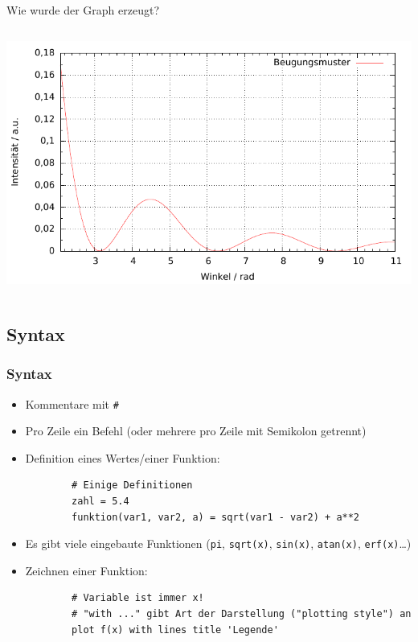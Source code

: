 \begin{frame}[<+->]
	Wie wurde der Graph erzeugt?

	\lstset{frame=L, numbers=left, xleftmargin=0.6cm}
	\begin{columns}
		
		\hspace*{-2.2cm}
		\includegraphics[width=1.6\textwidth]{res/beispiel.pdf}
		\vspace*{-2cm}
	\end{columns}
\end{frame}

\subsection{Syntax}

\begin{frame}[<+->][fragile]
	\frametitle{Syntax}
	\begin{itemize}
		\item Kommentare mit \lstinline|#|
		\item Pro Zeile ein Befehl (oder mehrere pro Zeile mit Semikolon getrennt)
		\item Definition eines Wertes/einer Funktion:
		\begin{lstlisting}
		# Einige Definitionen
		zahl = 5.4
		funktion(var1, var2, a) = sqrt(var1 - var2) + a**2
		\end{lstlisting}
		\item Es gibt viele eingebaute Funktionen (\lstinline|pi|, \lstinline|sqrt(x)|, \lstinline|sin(x)|, \lstinline|atan(x)|, \lstinline|erf(x)|\dots)
		\item Zeichnen einer Funktion:
		\begin{lstlisting}
		# Variable ist immer x!
		# "with ..." gibt Art der Darstellung ("plotting style") an
		plot f(x) with lines title 'Legende'
		\end{lstlisting}
	\end{itemize}
\end{frame}

